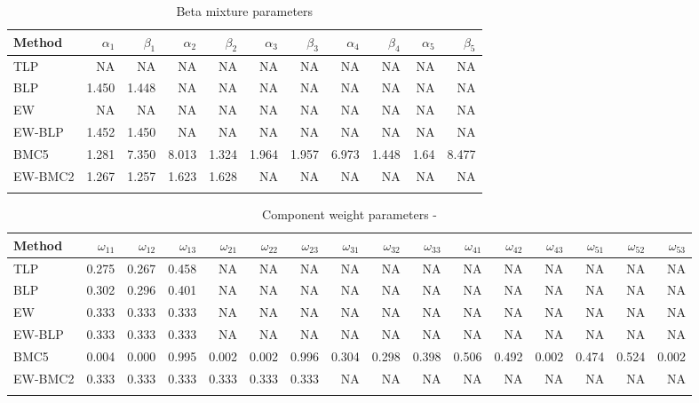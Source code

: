 \documentclass[
]{article}
\begin{document}
\begin{table}[H]

\caption{\label{tab:unnamed-chunk-4}Beta mixture parameters}
\centering
\fontsize{8}{10}\selectfont
\begin{tabular}[t]{lrrrrrrrrrr}
\toprule{}
Method & $\alpha_1$ & $\beta_1$ & $\alpha_2$ & $\beta_2$ & $\alpha_3$ & $\beta_3$ & $\alpha_4$ & $\beta_4$ & $\alpha_5$ & $\beta_5$\\
\midrule{}
TLP & NA & NA & NA & NA & NA & NA & NA & NA & NA & NA\\
BLP & 1.450 & 1.448 & NA & NA & NA & NA & NA & NA & NA & NA\\
EW & NA & NA & NA & NA & NA & NA & NA & NA & NA & NA\\
EW-BLP & 1.452 & 1.450 & NA & NA & NA & NA & NA & NA & NA & NA\\
BMC5 & 1.281 & 7.350 & 8.013 & 1.324 & 1.964 & 1.957 & 6.973 & 1.448 & 1.64 & 8.477\\
\addlinespace
EW-BMC2 & 1.267 & 1.257 & 1.623 & 1.628 & NA & NA & NA & NA & NA & NA\\
\bottomrule{}
\end{tabular}
\end{table}

\begin{table}[H]

\caption{\label{tab:unnamed-chunk-4}Component weight parameters -}
\centering
\fontsize{8}{10}\selectfont
\begin{tabular}[t]{lrrrrrrrrrrrrrrr}
\toprule{}
Method & $\omega_{11}$ & $\omega_{12}$ & $\omega_{13}$ & $\omega_{21}$ & $\omega_{22}$ & $\omega_{23}$ & $\omega_{31}$ & $\omega_{32}$ & $\omega_{33}$ & $\omega_{41}$ & $\omega_{42}$ & $\omega_{43}$ & $\omega_{51}$ & $\omega_{52}$ & $\omega_{53}$\\
\midrule{}
TLP & 0.275 & 0.267 & 0.458 & NA & NA & NA & NA & NA & NA & NA & NA & NA & NA & NA & NA\\
BLP & 0.302 & 0.296 & 0.401 & NA & NA & NA & NA & NA & NA & NA & NA & NA & NA & NA & NA\\
EW & 0.333 & 0.333 & 0.333 & NA & NA & NA & NA & NA & NA & NA & NA & NA & NA & NA & NA\\
EW-BLP & 0.333 & 0.333 & 0.333 & NA & NA & NA & NA & NA & NA & NA & NA & NA & NA & NA & NA\\
BMC5 & 0.004 & 0.000 & 0.995 & 0.002 & 0.002 & 0.996 & 0.304 & 0.298 & 0.398 & 0.506 & 0.492 & 0.002 & 0.474 & 0.524 & 0.002\\
\addlinespace
EW-BMC2 & 0.333 & 0.333 & 0.333 & 0.333 & 0.333 & 0.333 & NA & NA & NA & NA & NA & NA & NA & NA & NA\\
\bottomrule{}
\end{tabular}
\end{table}
\end{document}
